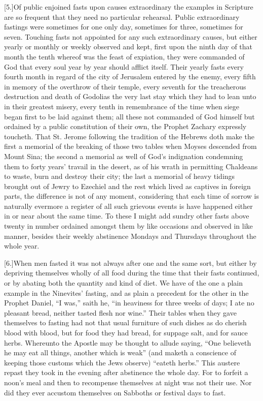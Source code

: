[5.]Of public enjoined fasts upon causes extraordinary the examples in Scripture are so frequent that they need no particular rehearsal. Public extraordinary fastings were sometimes for one only day, sometimes for three, sometimes for seven. Touching fasts not appointed for any such extraordinary causes, but either yearly or monthly or weekly observed and kept, first upon the ninth day of that month the tenth whereof was the feast of expiation, they were commanded of God that every soul year by year should afflict itself. Their yearly fasts every fourth month in regard of the city of Jerusalem entered by the enemy, every fifth in memory of the overthrow of their temple, every seventh for the treacherous destruction and death of Godolias the very last stay which they had to lean unto in their greatest misery, every tenth in remembrance of the time when siege began first to be laid against them; all these not commanded of God himself but ordained by a public constitution of their own, the Prophet Zachary expressly toucheth. That St. Jerome  following the tradition of the Hebrews doth make the first a memorial of the breaking of those two tables when Moyses descended from Mount Sina;
 the second a memorial as well of God’s indignation condemning them to forty years’ travail in the desert, as of his wrath in permitting Chaldeans to waste, burn and destroy their city; the last a memorial of heavy tidings brought out of Jewry to Ezechiel and the rest which lived as captives in foreign parts, the difference is not of any moment, considering that each time of sorrow is naturally evermore a register of all such grievous events is have happened either in or near about the same time. To these I might add sundry other fasts above twenty in number ordained amongst them by like occasions and observed in like manner, besides their weekly abstinence Mondays and Thursdays throughout the whole year.

[6.]When men fasted it was not always after one and the same sort, but either by depriving themselves wholly of all  food during the time that their fasts continued, or by abating both the quantity and kind of diet.
 We have of the one a plain example in the Ninevites’ fasting, and as plain a precedent for the other in the Prophet Daniel, “I was,” saith he, “in heaviness for three weeks of days; I ate no pleasant bread, neither tasted flesh nor wine.” Their tables when they gave themselves to fasting had not that usual furniture of such dishes as do cherish blood with blood, but for food they had bread, for suppage salt, and for sauce herbs. Whereunto the Apostle may be thought to allude saying, “One believeth he may eat all things, another which is weak” (and maketh a conscience of keeping those customs which the Jews observe) “eateth herbs.” This austere repast they took in the evening after abstinence the whole day. For to forfeit a noon’s meal and then to recompense themselves at night was not their use. Nor did they ever accustom themselves on Sabboths or festival days to fast.

